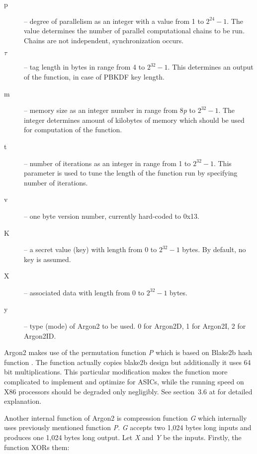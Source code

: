 \documentclass[nolof]{fithesis3}
\begin{document}
\begin{description}
\item[p] -- degree of parallelism as an integer with a value from 1 to \(2^{24} - 1\). The value determines the number of parallel computational chains to be run. Chains are not independent, synchronization occurs.

\item[\(\tau\)] -- tag length in bytes in range from 4 to \(2^{32} - 1\). This determines an output of the function, in case of PBKDF key length.

\item[m] -- memory size as an integer number in range from 8\emph{p} to \(2^{32} - 1\). The integer determines amount of kilobytes of memory which should be used for computation of the function.

\item[t] -- number of iterations as an integer in range from 1 to \(2^{32} - 1\). This parameter is used to tune the length of the function run by specifying number of iterations.

\item[v] -- one byte version number, currently hard-coded to 0x13.

\item[K] -- a secret value (key) with length from 0 to \(2^{32} - 1\) bytes. By default, no key is assumed.

\item[X] -- associated data with length from 0 to \(2^{32} - 1\) bytes.

\item[y] -- type (mode) of Argon2 to be used. 0 for Argon2D, 1 for Argon2I, 2 for Argon2ID.
\end{description}

Argon2 makes use of the permutation function \emph{P} which is based on Blake2b hash function \parencite{blake2}. The function actually copies blake2b design but additionally it uses 64 bit multiplications. This particular modification makes the function more complicated to implement and optimize for ASICs, while the running speed on X86 processors should be degraded only negligibly. See section~3.6 at \parencite{argon2draft} for detailed explanation.

Another internal function of Argon2 is compression function \emph{G} which internally uses previously mentioned function \emph{P}. \emph{G} accepts two 1,024 bytes long inputs and produces one 1,024 bytes long output. Let \emph{X} and \emph{Y} be the inputs. Firstly, the function XORs them:
\end{document}
